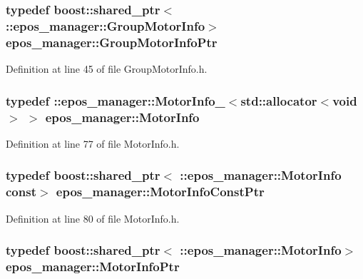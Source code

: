 \subsubsection[{\-Group\-Motor\-Info\-Ptr}]{\setlength{\rightskip}{0pt plus 5cm}typedef boost\-::shared\-\_\-ptr$<$ \-::{\bf epos\-\_\-manager\-::\-Group\-Motor\-Info}$>$ {\bf epos\-\_\-manager\-::\-Group\-Motor\-Info\-Ptr}}\label{namespaceepos__manager_a57789efed38b17775759e3b4de67e77e}


\-Definition at line 45 of file \-Group\-Motor\-Info.\-h.

\subsubsection[{\-Motor\-Info}]{\setlength{\rightskip}{0pt plus 5cm}typedef \-::{\bf epos\-\_\-manager\-::\-Motor\-Info\-\_\-}$<$std\-::allocator$<$void$>$ $>$ {\bf epos\-\_\-manager\-::\-Motor\-Info}}\label{namespaceepos__manager_a1f72ec63b0ce33410d42890a77074ee4}


\-Definition at line 77 of file \-Motor\-Info.\-h.

\subsubsection[{\-Motor\-Info\-Const\-Ptr}]{\setlength{\rightskip}{0pt plus 5cm}typedef boost\-::shared\-\_\-ptr$<$ \-::{\bf epos\-\_\-manager\-::\-Motor\-Info} const$>$ {\bf epos\-\_\-manager\-::\-Motor\-Info\-Const\-Ptr}}\label{namespaceepos__manager_a7f7646274994e7c56d873e370816058e}


\-Definition at line 80 of file \-Motor\-Info.\-h.

\subsubsection[{\-Motor\-Info\-Ptr}]{\setlength{\rightskip}{0pt plus 5cm}typedef boost\-::shared\-\_\-ptr$<$ \-::{\bf epos\-\_\-manager\-::\-Motor\-Info}$>$ {\bf epos\-\_\-manager\-::\-Motor\-Info\-Ptr}}\label{namespaceepos__manager_aa0aae942a740477a9945bfa3419edb24}


